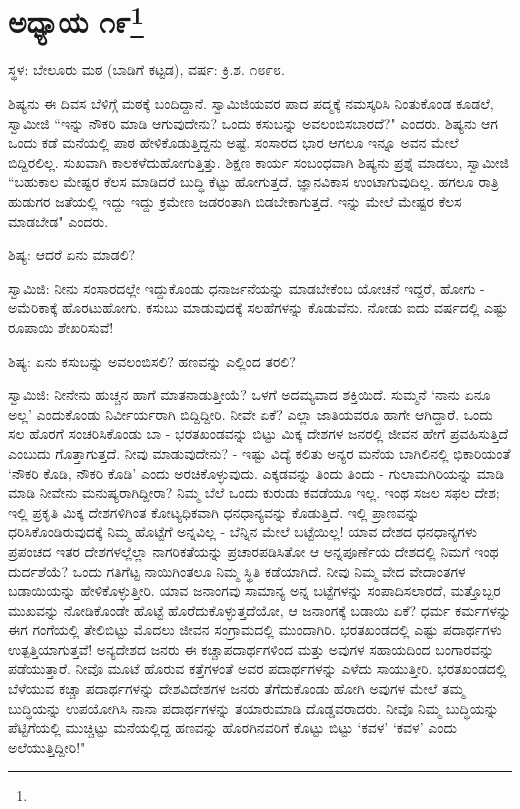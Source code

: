 \newpage

\chapter[ಅಧ್ಯಾಯ ೧೯]{ಅಧ್ಯಾಯ ೧೯\protect\footnote{}}

\begin{center}
ಸ್ಥಳ: ಬೇಲೂರು ಮಠ (ಬಾಡಿಗೆ ಕಟ್ಟಡ), ವರ್ಷ: ಕ್ರಿ.ಶ. ೧೮೯೮.
\end{center}

ಶಿಷ್ಯನು ಈ ದಿವಸ ಬೆಳಿಗ್ಗೆ ಮಠಕ್ಕೆ ಬಂದಿದ್ದಾನೆ. ಸ್ವಾಮಿಜಿಯವರ ಪಾದ ಪದ್ಮಕ್ಕೆ ನಮಸ್ಕರಿಸಿ ನಿಂತುಕೊಂಡ ಕೂಡಲೆ, ಸ್ವಾಮೀಜಿ “ಇನ್ನು ನೌಕರಿ ಮಾಡಿ ಆಗುವುದೇನು? ಒಂದು ಕಸುಬನ್ನು ಅವಲಂಬಿಸಬಾರದೆ?" ಎಂದರು. ಶಿಷ್ಯನು ಆಗ ಒಂದು ಕಡೆ ಮನೆಯಲ್ಲಿ ಪಾಠ ಹೇಳಿಕೊಡುತ್ತಿದ್ದನು ಅಷ್ಟೆ. ಸಂಸಾರದ ಭಾರ ಆಗಲೂ ಇನ್ನೂ ಅವನ ಮೇಲೆ ಬಿದ್ದಿರಲಿಲ್ಲ. ಸುಖವಾಗಿ ಕಾಲಕಳೆದುಹೋಗುತ್ತಿತ್ತು. ಶಿಕ್ಷಣ ಕಾರ್ಯ ಸಂಬಂಧವಾಗಿ ಶಿಷ್ಯನು ಪ್ರಶ್ನೆ ಮಾಡಲು, ಸ್ವಾಮೀಜಿ “ಬಹುಕಾಲ ಮೇಷ್ಟರ ಕೆಲಸ ಮಾಡಿದರೆ ಬುದ್ಧಿ ಕೆಟ್ಟು ಹೋಗುತ್ತದೆ. ಜ್ಞಾನವಿಕಾಸ ಉಂಟಾಗುವುದಿಲ್ಲ. ಹಗಲೂ ರಾತ್ರಿ ಹುಡುಗರ ಜತೆಯಲ್ಲಿ ಇದ್ದು ಇದ್ದು ಕ್ರಮೇಣ ಜಡರಂತಾಗಿ ಬಿಡಬೇಕಾಗುತ್ತದೆ. ಇನ್ನು ಮೇಲೆ ಮೇಷ್ಟರ ಕೆಲಸ ಮಾಡಬೇಡ" ಎಂದರು.

ಶಿಷ್ಯ: ಆದರೆ ಏನು ಮಾಡಲಿ?

ಸ್ವಾಮಿಜಿ: ನೀನು ಸಂಸಾರದಲ್ಲೇ ಇದ್ದುಕೊಂಡು ಧನಾರ್ಜನೆಯನ್ನು ಮಾಡಬೇಕೆಂಬ ಯೋಚನೆ ಇದ್ದರೆ, ಹೋಗು - ಅಮೆರಿಕಾಕ್ಕೆ ಹೊರಟುಹೋಗು. ಕಸುಬು ಮಾಡುವುದಕ್ಕೆ ಸಲಹೆಗಳನ್ನು ಕೊಡುವೆನು. ನೋಡು ಐದು ವರ್ಷದಲ್ಲಿ ಎಷ್ಟು ರೂಪಾಯಿ ಶೇಖರಿಸುವೆ!

ಶಿಷ್ಯ: ಏನು ಕಸುಬನ್ನು ಅವಲಂಬಿಸಲಿ? ಹಣವನ್ನು ಎಲ್ಲಿಂದ ತರಲಿ?

ಸ್ವಾಮಿಜಿ: ನೀನೇನು ಹುಚ್ಚನ ಹಾಗೆ ಮಾತನಾಡುತ್ತೀಯೆ? ಒಳಗೆ ಅದಮ್ಯವಾದ ಶಕ್ತಿಯಿದೆ. ಸುಮ್ಮನೆ ‘ನಾನು ಏನೂ ಅಲ್ಲ’ ಎಂದುಕೊಂಡು ನಿರ್ವೀರ್ಯರಾಗಿ ಬಿದ್ದಿದ್ದೀರಿ. ನೀವೇ ಏಕೆ? ಎಲ್ಲಾ ಜಾತಿಯವರೂ ಹಾಗೇ ಆಗಿದ್ದಾರೆ. ಒಂದು ಸಲ ಹೊರಗೆ ಸಂಚರಿಸಿಕೊಂಡು ಬಾ - ಭರತಖಂಡವನ್ನು ಬಿಟ್ಟು ಮಿಕ್ಕ ದೇಶಗಳ ಜನರಲ್ಲಿ ಜೀವನ ಹೇಗೆ ಪ್ರವಹಿಸುತ್ತಿದೆ ಎಂಬುದು ಗೊತ್ತಾಗುತ್ತದೆ. ನೀವು ಮಾಡುವುದೇನು? - ಇಷ್ಟು ವಿದ್ಯೆ ಕಲಿತು ಅನ್ಯರ ಮನೆಯ ಬಾಗಿಲಿನಲ್ಲಿ ಭಿಕಾರಿಯಂತೆ ‘ನೌಕರಿ ಕೊಡಿ, ನೌಕರಿ ಕೊಡಿ’ ಎಂದು ಅರಚಿಕೊಳ್ಳುವುದು. ಎಕ್ಕಡವನ್ನು ತಿಂದು ತಿಂದು - ಗುಲಾಮಗಿರಿಯನ್ನು ಮಾಡಿ ಮಾಡಿ ನೀವೇನು ಮನುಷ್ಯರಾಗಿದ್ದೀರಾ? ನಿಮ್ಮ ಬೆಲೆ ಒಂದು ಕುರುಡು ಕವಡೆಯೂ ಇಲ್ಲ. ಇಂಥ ಸಜಲ ಸಫಲ ದೇಶ; ಇಲ್ಲಿ ಪ್ರಕೃತಿ ಮಿಕ್ಕ ದೇಶಗಳಿಗಿಂತ ಕೋಟ್ಯಧಿಕವಾಗಿ ಧನಧಾನ್ಯವನ್ನು ಕೊಡುತ್ತಿದೆ. ಇಲ್ಲಿ ಪ್ರಾಣವನ್ನು ಧರಿಸಿಕೊಂಡಿರುವುದಕ್ಕೆ ನಿಮ್ಮ ಹೊಟ್ಟೆಗೆ ಅನ್ನವಿಲ್ಲ - ಬೆನ್ನಿನ ಮೇಲೆ ಬಟ್ಟೆಯಿಲ್ಲ! ಯಾವ ದೇಶದ ಧನಧಾನ್ಯಗಳು ಪ್ರಪಂಚದ ಇತರ ದೇಶಗಳಲ್ಲೆಲ್ಲಾ ನಾಗರಿಕತೆಯನ್ನು ಪ್ರಚಾರಪಡಿಸಿತೋ ಆ ಅನ್ನಪೂರ್ಣೆಯ ದೇಶದಲ್ಲಿ ನಿಮಗೆ ಇಂಥ ದುರ್ದಶೆಯೆ? ಒಂದು ಗತಿಗೆಟ್ಟ ನಾಯಿಗಿಂತಲೂ ನಿಮ್ಮ ಸ್ಥಿತಿ ಕಡೆಯಾಗಿದೆ. ನೀವು ನಿಮ್ಮ ವೇದ ವೇದಾಂತಗಳ ಬಡಾಯಿಯನ್ನು ಹೇಳಿಕೊಳ್ಳುತ್ತೀರಿ. ಯಾವ ಜನಾಂಗವು ಸಾಮಾನ್ಯ ಅನ್ನ ಬಟ್ಟೆಗಳನ್ನು ಸಂಪಾದಿಸಲಾರದೆ, ಮತ್ತೊಬ್ಬರ ಮುಖವನ್ನು ನೋಡಿಕೊಂಡೇ ಹೊಟ್ಟೆ ಹೊರೆದುಕೊಳ್ಳುತ್ತದೆಯೋ, ಆ ಜನಾಂಗಕ್ಕೆ ಬಡಾಯಿ ಏಕೆ? ಧರ್ಮ ಕರ್ಮಗಳನ್ನು ಈಗ ಗಂಗೆಯಲ್ಲಿ ತೇಲಿಬಿಟ್ಟು ಮೊದಲು ಜೀವನ ಸಂಗ್ರಾಮದಲ್ಲಿ ಮುಂದಾಗಿರಿ. ಭರತಖಂಡದಲ್ಲಿ ಎಷ್ಟು ಪದಾರ್ಥಗಳು ಉತ್ಪತ್ತಿಯಾಗುತ್ತವೆ! ಅನ್ಯದೇಶದ ಜನರು ಈ ಕಚ್ಚಾಪದಾರ್ಥಗಳಿಂದ ಮತ್ತು ಅವುಗಳ ಸಹಾಯದಿಂದ ಬಂಗಾರವನ್ನು ಪಡೆಯುತ್ತಾರೆ. ನೀವೊ ಮೂಟೆ ಹೊರುವ ಕತ್ತೆಗಳಂತೆ ಅವರ ಪದಾರ್ಥಗಳನ್ನು ಎಳೆದು ಸಾಯುತ್ತೀರಿ. ಭರತಖಂಡದಲ್ಲಿ ಬೆಳೆಯುವ ಕಚ್ಚಾ ಪದಾರ್ಥಗಳನ್ನು ದೇಶವಿದೇಶಗಳ ಜನರು ತೆಗೆದುಕೊಂಡು ಹೋಗಿ ಅವುಗಳ ಮೇಲೆ ತಮ್ಮ ಬುದ್ಧಿಯನ್ನು ಉಪಯೋಗಿಸಿ ನಾನಾ ಪದಾರ್ಥಗಳನ್ನು ತಯಾರುಮಾಡಿ ದೊಡ್ಡವರಾದರು. ನೀವೊ ನಿಮ್ಮ ಬುದ್ಧಿಯನ್ನು ಪೆಟ್ಟಿಗೆಯಲ್ಲಿ ಮುಚ್ಚಿಟ್ಟು ಮನೆಯಲ್ಲಿದ್ದ ಹಣವನ್ನು ಹೊರಗಿನವರಿಗೆ ಕೊಟ್ಟು ಬಿಟ್ಟು ‘ಕವಳ’ ‘ಕವಳ’ ಎಂದು ಅಲೆಯುತ್ತಿದ್ದೀರಿ!"

